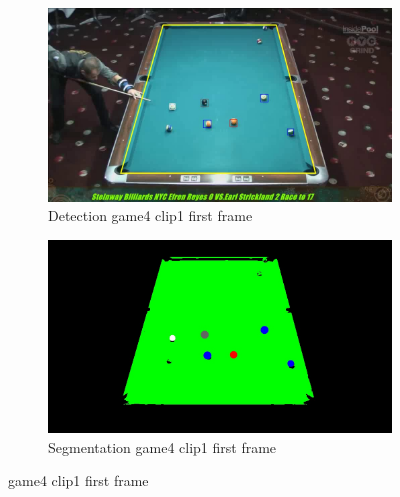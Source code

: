 \begin{figure}[H]
    \centering
    \begin{subfigure}[b]{0.35\textwidth}
        \centering
        \includegraphics[width=\textwidth]{images/Detection/game4_clip1_detected_balls_first_frame.jpg}
        \caption{Detection game4 clip1 first frame}
        \label{fig: game4_clip1_first_frame_detected}
    \end{subfigure}
    \begin{subfigure}[b]{0.35\textwidth}
        \centering
        \includegraphics[width=\textwidth]{images/Segmentation/game4_clip1_segmented_balls_first_frame.jpg}
        \caption{Segmentation game4 clip1 first frame}
		\label{fig: game4_clip1_first_frame_segmented}
    \end{subfigure}
	\caption{game4 clip1 first frame}
\end{figure}

